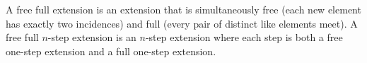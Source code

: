 A free full extension is an extension that is simultaneously free (each new element has exactly two incidences) and full (every pair of distinct like elements meet). A free full $n$-step extension is an $n$-step extension where each step is both a free one-step extension and a full one-step extension.
